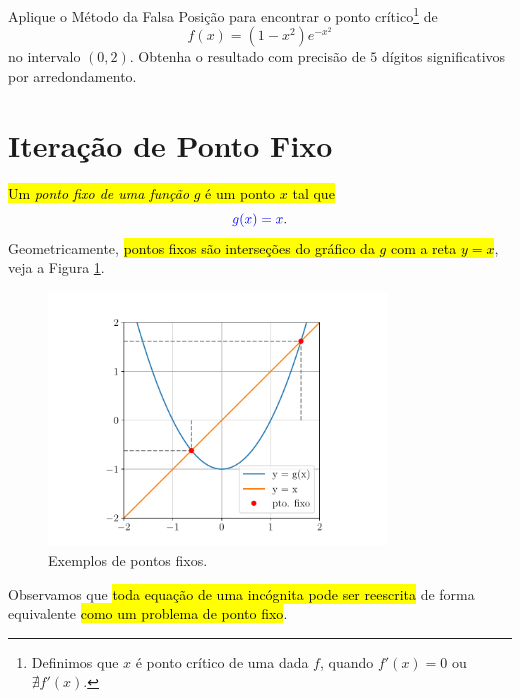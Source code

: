 \begin{exer}
  Aplique o Método da Falsa Posição para encontrar o ponto crítico\footnote{Definimos que $x$ é ponto crítico de uma dada $f$, quando $f'(x) = 0$ ou $\nexists f'(x)$.} de
  \begin{equation}
    f(x) = (1-x^2)e^{-x^2}
  \end{equation}
  no intervalo $(0, 2)$. Obtenha o resultado com precisão de $5$ dígitos significativos por arredondamento.
\end{exer}

\section{Iteração de Ponto Fixo}\label{cap_eq1d_sec_pfixo}

\hl{Um \emph{ponto fixo de uma função} $g$ é um ponto $x$ tal que}
\begin{equation}
  {\color{blue}g(x) = x}.
\end{equation}
Geometricamente, \hl{pontos fixos são interseções do gráfico da $g$ com a reta $y=x$}, veja a Figura \ref{cap_eq1d_sec_pfixo:fig:pfixo}.

\begin{figure}[H]
  \centering
  \includegraphics[width=0.8\textwidth]{./cap_eq1d/dados/fig_pfixo/fig}
  \caption{Exemplos de pontos fixos.}
  \label{cap_eq1d_sec_pfixo:fig:pfixo}
\end{figure}

Observamos que \hl{toda equação de uma incógnita pode ser reescrita} de forma equivalente \hl{como um problema de ponto fixo}.

